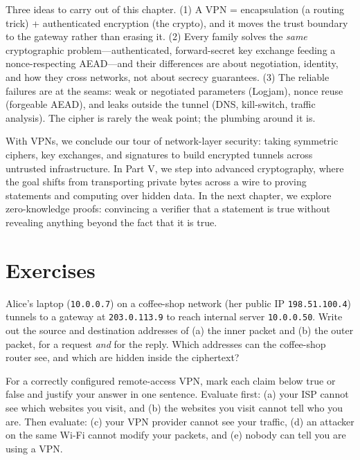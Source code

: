 \begin{recoverybox}
Three ideas to carry out of this chapter. (1) A VPN = encapsulation (a routing trick) + authenticated encryption (the crypto), and it moves the trust boundary to the gateway rather than erasing it. (2) Every family solves the \emph{same} cryptographic problem---authenticated, forward-secret key exchange feeding a nonce-respecting AEAD---and their differences are about negotiation, identity, and how they cross networks, not about secrecy guarantees. (3) The reliable failures are at the seams: weak or negotiated parameters (Logjam), nonce reuse (forgeable AEAD), and leaks outside the tunnel (DNS, kill-switch, traffic analysis). The cipher is rarely the weak point; the plumbing around it is.
\end{recoverybox}

With VPNs, we conclude our tour of network-layer security: taking symmetric ciphers, key exchanges, and signatures to build encrypted tunnels across untrusted infrastructure. In Part V, we step into advanced cryptography, where the goal shifts from transporting private bytes across a wire to proving statements and computing over hidden data. In the next chapter, we explore zero-knowledge proofs: convincing a verifier that a statement is true without revealing anything beyond the fact that it is true.

\section{Exercises}
\label{ch30:exercises}

\begin{exercise}
Alice's laptop (\texttt{10.0.0.7}) on a coffee-shop network (her public IP \texttt{198.51.100.4}) tunnels to a gateway at \texttt{203.0.113.9} to reach internal server \texttt{10.0.0.50}. Write out the source and destination addresses of (a) the inner packet and (b) the outer packet, for a request \emph{and} for the reply. Which addresses can the coffee-shop router see, and which are hidden inside the ciphertext?
\end{exercise}

\begin{exercise}
For a correctly configured remote-access VPN, mark each claim below true or false and justify your answer in one sentence. Evaluate first: (a) your ISP cannot see which websites you visit, and (b) the websites you visit cannot tell who you are. Then evaluate: (c) your VPN provider cannot see your traffic, (d) an attacker on the same Wi-Fi cannot modify your packets, and (e) nobody can tell you are using a VPN.
\end{exercise}

